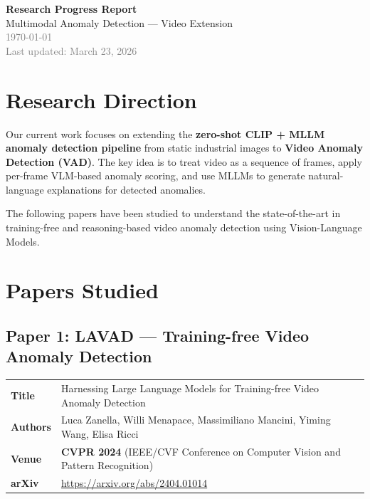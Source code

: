 \documentclass[12pt, a4paper]{article}
\begin{document}
\begin{center}
    {\LARGE\bfseries Research Progress Report}\\[6pt]
    {\large Multimodal Anomaly Detection --- Video Extension}\\[12pt]
    \textcolor{gray}{\today}\\[4pt]
    \textcolor{gray}{Last updated: March 23, 2026}
\end{center}

\vspace{1em}

\section{Research Direction}

Our current work focuses on extending the \textbf{zero-shot CLIP + MLLM anomaly detection pipeline} from static industrial images to \textbf{Video Anomaly Detection (VAD)}. The key idea is to treat video as a sequence of frames, apply per-frame VLM-based anomaly scoring, and use MLLMs to generate natural-language explanations for detected anomalies.

The following papers have been studied to understand the state-of-the-art in training-free and reasoning-based video anomaly detection using Vision-Language Models.

\vspace{0.5em}

\section{Papers Studied}

\subsection{Paper 1: LAVAD --- Training-free Video Anomaly Detection}

\begin{tabularx}{\textwidth}{@{}l X@{}}
    \toprule
    \textbf{Title}   & Harnessing Large Language Models for Training-free Video Anomaly Detection \\
    \textbf{Authors}  & Luca Zanella, Willi Menapace, Massimiliano Mancini, Yiming Wang, Elisa Ricci \\
    \textbf{Venue}    & \textbf{CVPR 2024} (IEEE/CVF Conference on Computer Vision and Pattern Recognition) \\
    \textbf{arXiv}    & \url{https://arxiv.org/abs/2404.01014} \\
    \bottomrule
\end{tabularx}
\end{document}
